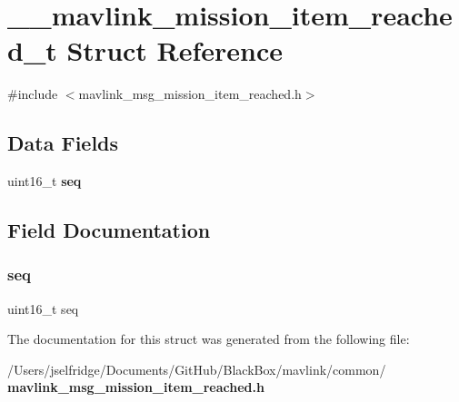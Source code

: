 \section{\+\_\+\+\_\+mavlink\+\_\+mission\+\_\+item\+\_\+reached\+\_\+t Struct Reference}
\label{struct____mavlink__mission__item__reached__t}


{\ttfamily \#include $<$mavlink\+\_\+msg\+\_\+mission\+\_\+item\+\_\+reached.\+h$>$}

\subsection*{Data Fields}
\begin{DoxyCompactItemize}
\item 
uint16\+\_\+t \textbf{ seq}
\end{DoxyCompactItemize}


\subsection{Field Documentation}
\mbox{\label{struct____mavlink__mission__item__reached__t_a0a97914b75ed3ab7d0e13d8b200d758a}} 
\subsubsection{seq}
{\footnotesize\ttfamily uint16\+\_\+t seq}



The documentation for this struct was generated from the following file\+:\begin{DoxyCompactItemize}
\item 
/\+Users/jselfridge/\+Documents/\+Git\+Hub/\+Black\+Box/mavlink/common/\textbf{ mavlink\+\_\+msg\+\_\+mission\+\_\+item\+\_\+reached.\+h}\end{DoxyCompactItemize}
